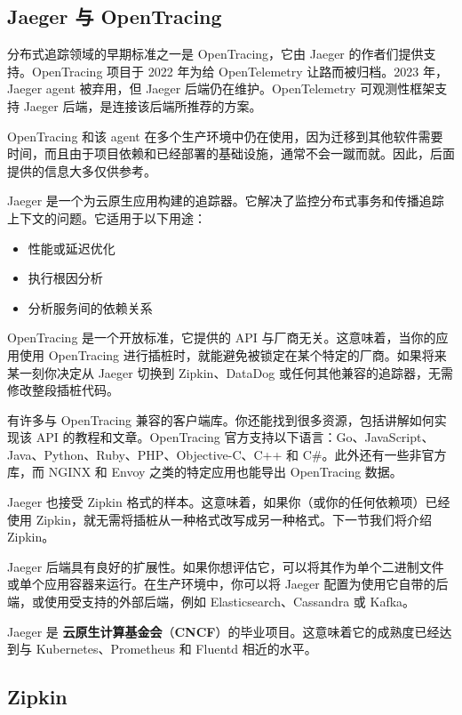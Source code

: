 \subsection{Jaeger 与 OpenTracing}

\label{idx:1910}
\label{idx:1911}
\label{idx:1912}
\label{idx:1913}
分布式追踪领域的早期标准之一是 OpenTracing，它由 Jaeger 的作者们提供支持。OpenTracing 项目于 2022 年为给 OpenTelemetry 让路而被归档。2023 年，Jaeger agent 被弃用，但 Jaeger 后端仍在维护。OpenTelemetry 可观测性框架支持 Jaeger 后端，是连接该后端所推荐的方案。

\label{idx:1914}
OpenTracing 和该 agent 在多个生产环境中仍在使用，因为迁移到其他软件需要时间，而且由于项目依赖和已经部署的基础设施，通常不会一蹴而就。因此，后面提供的信息大多仅供参考。

\label{idx:1915}
Jaeger 是一个为云原生应用构建的追踪器。它解决了监控分布式事务和传播追踪上下文的问题。它适用于以下用途：

\begin{itemize}
\item 性能或延迟优化
\item 执行根因分析
\item 分析服务间的依赖关系
\end{itemize}

OpenTracing 是一个开放标准，它提供的 API 与厂商无关。这意味着，当你的应用使用 OpenTracing 进行插桩时，就能避免被锁定在某个特定的厂商。如果将来某一刻你决定从 Jaeger 切换到 Zipkin、DataDog 或任何其他兼容的追踪器，无需修改整段插桩代码。

有许多与 OpenTracing 兼容的客户端库。你还能找到很多资源，包括讲解如何实现该 API 的教程和文章。OpenTracing 官方支持以下语言：Go、JavaScript、Java、Python、Ruby、PHP、Objective-C、C++ 和 C\#。此外还有一些非官方库，而 NGINX 和 Envoy 之类的特定应用也能导出 OpenTracing 数据。

Jaeger 也接受 Zipkin 格式的样本。这意味着，如果你（或你的任何依赖项）已经使用 Zipkin，就无需将插桩从一种格式改写成另一种格式。下一节我们将介绍 Zipkin。

Jaeger 后端具有良好的扩展性。如果你想评估它，可以将其作为单个二进制文件或单个应用容器来运行。在生产环境中，你可以将 Jaeger 配置为使用它自带的后端，或使用受支持的外部后端，例如 Elasticsearch、Cassandra 或 Kafka。

\label{idx:1916}
Jaeger 是 \textbf{云原生计算基金会}（\textbf{CNCF}）的毕业项目。这意味着它的成熟度已经达到与 Kubernetes、Prometheus 和 Fluentd 相近的水平。

\subsection{Zipkin}

